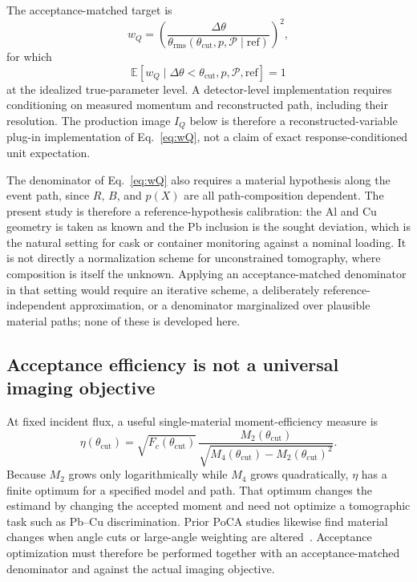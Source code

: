 \documentclass[aps,pra,reprint,longbibliography,floatfix]{revtex4-2}
\newcommand{\thetarms}{\ensuremath{\theta_{\mathrm{rms}}}}
\newcommand{\thetacut}{\ensuremath{\theta_{\mathrm{cut}}}}
\newcommand{\dtheta}{\ensuremath{\Delta\theta}}
\newcommand{\IQ}{\ensuremath{I_Q}}
\newcommand{\pathP}{\ensuremath{\mathcal{P}}}
\begin{document}
The acceptance-matched target is
\begin{equation}\label{eq:wQ}
w_Q=\left(\frac{\dtheta}{\thetarms(\thetacut,p,\pathP\mid\mathrm{ref})}\right)^2,
\end{equation}
for which
\begin{equation}\label{eq:EwQ}
\mathbb{E}[w_Q\mid \dtheta<\thetacut,p,\pathP,\mathrm{ref}]=1
\end{equation}
at the idealized true-parameter level.  A detector-level implementation requires conditioning on measured momentum and reconstructed path, including their resolution.  The production image $\IQ$ below is therefore a reconstructed-variable plug-in implementation of Eq.~\eqref{eq:wQ}, not a claim of exact response-conditioned unit expectation.

The denominator of Eq.~\eqref{eq:wQ} also requires a material hypothesis along the event path, since $R$, $B$, and $p(X)$ are all path-composition dependent.  The present study is therefore a reference-hypothesis calibration: the Al and Cu geometry is taken as known and the Pb inclusion is the sought deviation, which is the natural setting for cask or container monitoring against a nominal loading.  It is not directly a normalization scheme for unconstrained tomography, where composition is itself the unknown.  Applying an acceptance-matched denominator in that setting would require an iterative scheme, a deliberately reference-independent approximation, or a denominator marginalized over plausible material paths; none of these is developed here.

\subsection{Acceptance efficiency is not a universal imaging objective}\label{sec:optcut}
At fixed incident flux, a useful single-material moment-efficiency measure is
\begin{equation}\label{eq:eta}
\eta(\thetacut)=\sqrt{F_c(\thetacut)}\,
\frac{M_2(\thetacut)}{\sqrt{M_4(\thetacut)-M_2(\thetacut)^2}}.
\end{equation}
Because $M_2$ grows only logarithmically while $M_4$ grows quadratically, $\eta$ has a finite optimum for a specified model and path.  That optimum changes the estimand by changing the accepted moment and need not optimize a tomographic task such as Pb--Cu discrimination.  Prior PoCA studies likewise find material changes when angle cuts or large-angle weighting are altered~\cite{riggi2021,wen2023,wang2025}.  Acceptance optimization must therefore be performed together with an acceptance-matched denominator and against the actual imaging objective.
\end{document}

